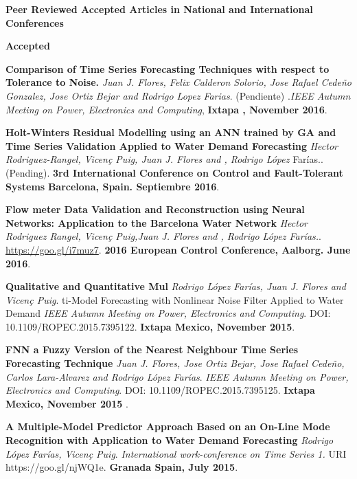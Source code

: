 \documentclass[10pt]{article}
\newenvironment{innerlist}[1][\enskip\textbullet]%
        {\begin{compactitem}[#1]}{\end{compactitem}}
\newcommand{\blankline}{\quad\pagebreak[2]}
\begin{document}
\blankline



\textbf{Peer Reviewed Accepted Articles in National and International Conferences}

\blankline
\textbf{Accepted}
\begin{innerlist}


\item \textbf{Comparison of Time Series Forecasting Techniques with respect to Tolerance to Noise.} \textit{Juan J. Flores, Felix Calderon Solorio, Jose Rafael Cede\~no Gonzalez, Jose Ortiz Bejar and Rodrigo Lopez Farias}. (Pendiente) .\textit{IEEE Autumn Meeting on Power, Electronics and Computing}, \textbf{Ixtapa , November 2016}.


\item \textbf{Holt-Winters Residual Modelling using an ANN trained by GA and Time Series Validation Applied to Water Demand Forecasting} \textit{Hector Rodriguez-Rangel, Vicen\c{c} Puig, Juan J. Flores and ,  Rodrigo López} Farías.. (Pending). \textbf{3rd International Conference on Control and Fault-Tolerant Systems} \textbf{Barcelona, Spain. Septiembre 2016}.

\item \textbf{Flow meter Data Validation and Reconstruction using Neural Networks: Application to the Barcelona Water Network} \textit{Hector Rodriguez Rangel, Vicen\c{c} Puig,Juan J. Flores and ,  Rodrigo López Farías.}. \url{https://goo.gl/i7muz7}. \textbf{2016 European Control Conference, Aalborg. June 2016}.

\item \textbf{Qualitative and Quantitative Mul} \textit{Rodrigo López Farías, Juan J. Flores and Vicen\c{c} Puig}.  ti-Model Forecasting with Nonlinear Noise Filter Applied to Water Demand \textit{IEEE Autumn Meeting on Power, Electronics and Computing}. DOI: 10.1109/ROPEC.2015.7395122.  \textbf{Ixtapa Mexico, November 2015}.

\item \textbf{FNN a Fuzzy Version of the Nearest Neighbour Time Series Forecasting Technique } \textit{Juan J. Flores, Jose Ortiz Bejar, Jose Rafael Cedeño, Carlos Lara-Alvarez and Rodrigo López Farías}. \textit{IEEE Autumn Meeting on Power, Electronics and Computing}. DOI: 10.1109/ROPEC.2015.7395125. \textbf{Ixtapa Mexico, November 2015 }.

\item \textbf{A Multiple-Model Predictor Approach Based on an On-Line Mode Recognition with Application to Water Demand Forecasting} \textit{Rodrigo López Farías, Vicen\c{c} Puig}.  \textit{International work-conference on Time Series 1. 
} URI https://goo.gl/njWQ1e. \textbf{Granada Spain, July 2015}.


\end{innerlist}
\end{document}

